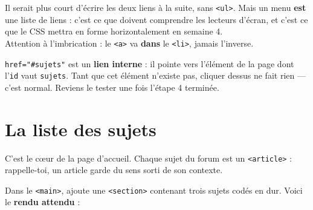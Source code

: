 \documentclass[a4paper,11pt]{article}
\begin{document}
\begin{tcolorbox}[attention, title={Un menu est une liste --- même si ça surprend}]
Il serait plus court d'écrire les deux liens à la suite, sans \texttt{<ul>}. Mais un menu \textbf{est} une liste de liens : c'est ce que doivent comprendre les lecteurs d'écran, et c'est ce que le CSS mettra en forme horizontalement en semaine 4.\\[4pt]
Attention à l'imbrication : le \texttt{<a>} va \textbf{dans} le \texttt{<li>}, jamais l'inverse.
\end{tcolorbox}

\begin{tcolorbox}[astuce, title={Le lien avec le \texttt{\#}}]
\texttt{href="\#sujets"} est un \textbf{lien interne} : il pointe vers l'élément de la page dont l'\texttt{id} vaut \texttt{sujets}. Tant que cet élément n'existe pas, cliquer dessus ne fait rien --- c'est normal. Reviens le tester une fois l'étape 4 terminée.
\end{tcolorbox}

\section{La liste des sujets}

C'est le c\oe ur de la page d'accueil. Chaque sujet du forum est un \texttt{<article>} : rappelle-toi, un article garde du sens sorti de son contexte.

Dans le \texttt{<main>}, ajoute une \texttt{<section>} contenant trois sujets codés en dur. Voici le \textbf{rendu attendu} :
\end{document}
